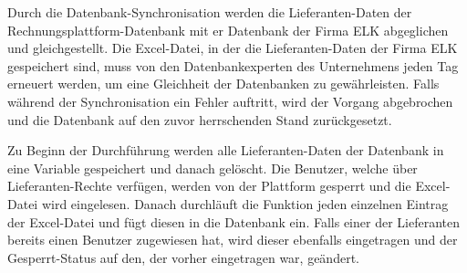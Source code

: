 Durch die Datenbank-Synchronisation werden die Lieferanten-Daten der Rechnungsplattform-Datenbank mit er Datenbank der Firma ELK abgeglichen und gleichgestellt. Die Excel-Datei, in der die Lieferanten-Daten der Firma ELK gespeichert sind, muss von den Datenbankexperten des Unternehmens jeden Tag erneuert werden, um eine Gleichheit der Datenbanken zu gewährleisten. Falls während der Synchronisation ein Fehler auftritt, wird der Vorgang abgebrochen und die Datenbank auf den zuvor herrschenden Stand zurückgesetzt.

Zu Beginn der Durchführung werden alle Lieferanten-Daten der Datenbank in eine Variable gespeichert und danach gelöscht. Die Benutzer, welche über Lieferanten-Rechte verfügen, werden von der Plattform gesperrt und die Excel-Datei wird eingelesen. Danach durchläuft die Funktion jeden einzelnen Eintrag der Excel-Datei und fügt diesen in die Datenbank ein. Falls einer der Lieferanten bereits einen Benutzer zugewiesen hat, wird dieser ebenfalls eingetragen und der Gesperrt-Status auf den, der vorher eingetragen war, geändert.

